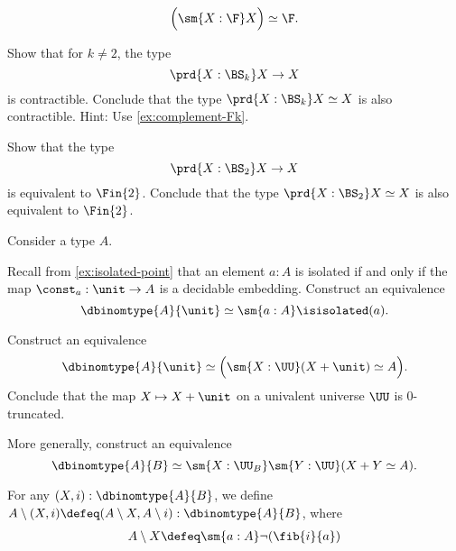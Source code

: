 \begin{exercises}
\begin{subexenum}
  \begin{equation*}
    \Big(\sm{X:\F}X\Big)\simeq \F.
  \end{equation*}
  \end{subexenum}
  \exitem 
  \begin{subexenum}
  \item Show that for $k\neq 2$, the type
    \begin{equation*}
      \prd{X:\BS_k}X\to X
    \end{equation*}
    is contractible. Conclude that the type $\prd{X:\BS_k}X\simeq X$ is also contractible. Hint: Use \cref{ex:complement-Fk}.
  \item Show that the type
    \begin{equation*}
      \prd{X:\BS_2}X\to X
    \end{equation*}
    is equivalent to $\Fin{2}$. Conclude that the type $\prd{X:\BS_2}X\simeq X$ is also equivalent to $\Fin{2}$.
  \end{subexenum}
  \exitem Consider a type $A$.
  \begin{subexenum}
  \item Recall from \cref{ex:isolated-point} that an element $a:A$ is isolated if and only if the map $\const_a:\unit\to A$ is a decidable embedding. Construct an equivalence
  \begin{equation*}
    \dbinomtype{A}{\unit}\simeq \sm{a:A}\isisolated(a).
  \end{equation*}
  \item Construct an equivalence
    \begin{equation*}
      \dbinomtype{A}{\unit}\simeq\Big(\sm{X:\UU}(X+\unit)\simeq A\Big).
    \end{equation*}
    Conclude that the map $X\mapsto X+\unit$ on a univalent universe $\UU$ is $0$-truncated.
  \item More generally, construct an equivalence
    \begin{equation*}
      \dbinomtype{A}{B} \simeq \sm{X:\UU_B}\sm{Y:\UU}(X+Y\simeq A).
    \end{equation*}
  \end{subexenum}
  \exitem \label{ex:binomial-theorem}For any $(X,i):\dbinomtype{A}{B}$, we define $A\setminus(X,i)\defeq (A\setminus X,A\setminus i):\dbinomtype{A}{B}$, where
  \begin{align*}
    A\setminus X & \defeq \sm{a:A}\neg(\fib{i}{a}) \\

\end{align*}
\end{exercises}
